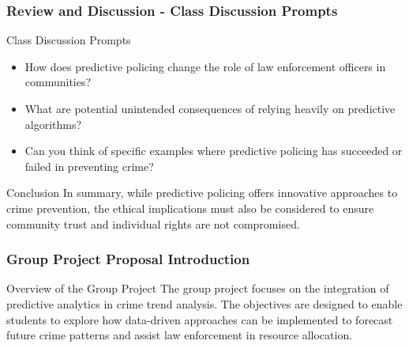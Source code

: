 \documentclass[aspectratio=169]{beamer}
\begin{document}
\begin{frame}[fragile]
    \frametitle{Review and Discussion - Class Discussion Prompts}
    \begin{block}{Class Discussion Prompts}
        \begin{itemize}
            \item How does predictive policing change the role of law enforcement officers in communities?
            \item What are potential unintended consequences of relying heavily on predictive algorithms?
            \item Can you think of specific examples where predictive policing has succeeded or failed in preventing crime?
        \end{itemize}
    \end{block}
    \begin{block}{Conclusion}
        In summary, while predictive policing offers innovative approaches to crime prevention, the ethical implications must also be considered to ensure community trust and individual rights are not compromised.
    \end{block}
\end{frame}

\begin{frame}[fragile]
    \frametitle{Group Project Proposal Introduction}
    \begin{block}{Overview of the Group Project}
        The group project focuses on the integration of predictive analytics in crime trend analysis. The objectives are designed to enable students to explore how data-driven approaches can be implemented to forecast future crime patterns and assist law enforcement in resource allocation.
    \end{block}
\end{frame}
\end{document}
